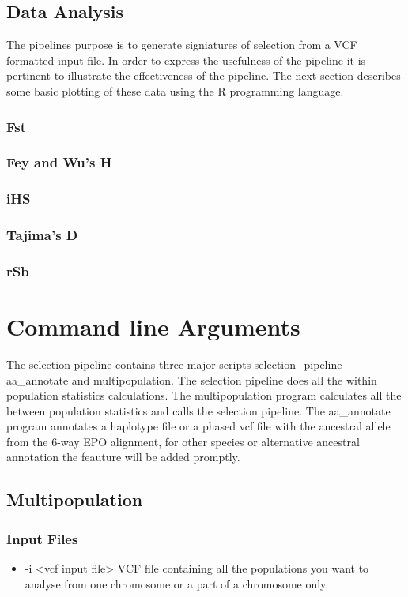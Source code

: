 \documentclass[a4paper,10pt]{article}
\begin{document}
\subsection{Data Analysis}
The pipelines purpose is to generate signiatures of selection from a VCF formatted input file. In order to express the usefulness of the pipeline it is pertinent to illustrate the effectiveness of the pipeline. The next section describes some basic plotting of these data using the R programming language.
\subsubsection{Fst}
\subsubsection{Fey and Wu's H}
\subsubsection{iHS}
\subsubsection{Tajima's D}
\subsubsection{rSb}

\section{Command line Arguments}
The selection pipeline contains three major scripts selection\_pipeline aa\_annotate and multipopulation. The selection pipeline does all the within population statistics calculations. The multipopulation program calculates all the between population statistics and calls the selection pipeline. The aa\_annotate program annotates a haplotype file or a phased vcf file with the ancestral allele from the 6-way EPO alignment, for other species or alternative ancestral annotation the feauture will be added promptly.
\subsection{Multipopulation}
\subsubsection{Input Files}
\begin{itemize}
\item -i <vcf input file>
VCF file containing all the populations you want to analyse from one chromosome or a part of a chromosome only. 
\end{itemize}
\end{document}
